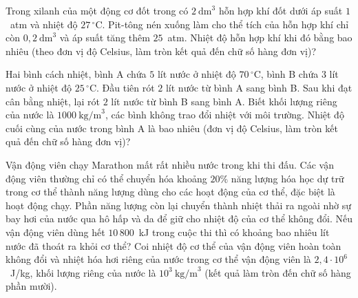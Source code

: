 	\begin{ex}%
		Trong xilanh của một động cơ đốt trong có $2~\text{dm}^3$ hỗn hợp khí đốt dưới áp suất $1$~atm và nhiệt độ $27\,^\circ\text{C}$. Pit-tông nén xuống làm cho thể tích của hỗn hợp khí chỉ còn $0{,}2~\text{dm}^3$ và áp suất tăng thêm $25$~atm. Nhiệt độ hỗn hợp khí khi đó bằng bao nhiêu (theo đơn vị độ Celsius, làm tròn kết quả đến chữ số hàng đơn vị)?
		\par
	\end{ex}

	\begin{ex}%
		Hai bình cách nhiệt, bình A chứa $5$ lít nước ở nhiệt độ $70\,^\circ\text{C}$, bình B chứa $3$ lít nước ở nhiệt độ $25\,^\circ\text{C}$. Đầu tiên rót $2$ lít nước từ bình A sang bình B. Sau khi đạt cân bằng nhiệt, lại rót $2$ lít nước từ bình B sang bình A. Biết khối lượng riêng của nước là $1000~\text{kg/m}^3$, các bình không trao đổi nhiệt với môi trường. Nhiệt độ cuối cùng của nước trong bình A là bao nhiêu (đơn vị độ Celsius, làm tròn kết quả đến chữ số hàng đơn vị)?
		\par
	\end{ex}

	\begin{ex}%
		Vận động viên chạy Marathon mất rất nhiều nước trong khi thi đấu. Các vận động viên thường chỉ có thể chuyển hóa khoảng $20\%$ năng lượng hóa học dự trữ trong cơ thể thành năng lượng dùng cho các hoạt động của cơ thể, đặc biệt là hoạt động chạy. Phần năng lượng còn lại chuyển thành nhiệt thải ra ngoài nhờ sự bay hơi của nước qua hô hấp và da để giữ cho nhiệt độ của cơ thể không đổi. Nếu vận động viên dùng hết $10\,800$~kJ trong cuộc thi thì có khoảng bao nhiêu lít nước đã thoát ra khỏi cơ thể? Coi nhiệt độ cơ thể của vận động viên hoàn toàn không đổi và nhiệt hóa hơi riêng của nước trong cơ thể vận động viên là $2{,}4\cdot 10^6$~J/kg, khối lượng riêng của nước là $10^3~\text{kg/m}^3$ (kết quả làm tròn đến chữ số hàng phần mười).
		\par
	\end{ex}

